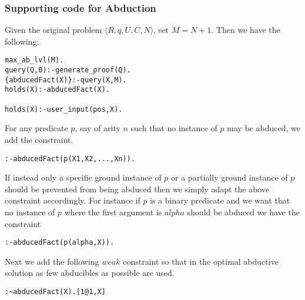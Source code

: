 \subsubsection{Supporting code for Abduction} 
Given the original problem $\langle R,q,U,C,N\rangle$, set $M=N+1$. Then we have the following: 
\begin{verbatim}
max_ab_lvl(M).
query(Q,0):-generate_proof(Q).
{abducedFact(X)}:-query(X,M).
holds(X):-abducedFact(X).

holds(X):-user_input(pos,X).
\end{verbatim}
For any predicate $p$, say of arity $n$ such that no instance of $p$ may be abduced, we add the constraint.
\begin{verbatim} 
:-abducedFact(p(X1,X2,...,Xn)).
\end{verbatim}
If instead only a specific ground instance of $p$ or a partially ground instance of $p$ should be prevented from being abduced then we simply adapt the above constraint accordingly. For instance if $p$ is a binary predicate and we want that no instance of $p$ where the first argument is $alpha$ should be abduced we have the constraint
\begin{verbatim} 
:-abducedFact(p(alpha,X)).
\end{verbatim}
Next we add the following $weak$ constraint so that in the optimal abductive
solution as few abducibles as possible are used.
\begin{verbatim} 
:~abducedFact(X).[1@1,X]
\end{verbatim}

